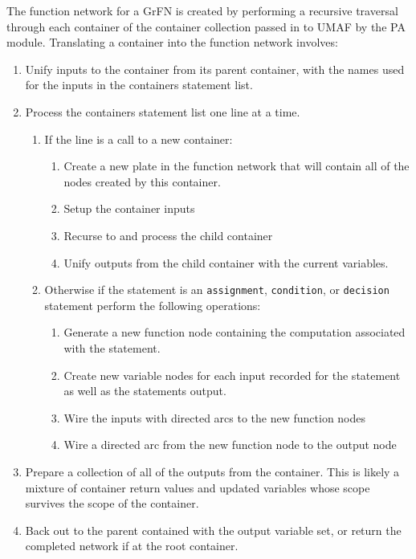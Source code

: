 The function network for a GrFN is created by performing a recursive traversal through each container of the container collection passed in to UMAF by the PA module.
Translating a container into the function network involves:
\begin{enumerate}
  \item Unify inputs to the container from its parent container, with the names used for the inputs in the containers statement list.
  \item Process the containers statement list one line at a time.
  \begin{enumerate}
    \item If the line is a call to a new container:
    \begin{enumerate}
      \item Create a new plate in the function network that will contain all of the nodes created by this container.
      \item Setup the container inputs
      \item Recurse to and process the child container
      \item Unify outputs from the child container with the current variables.
    \end{enumerate}
    \item Otherwise if the statement is an \texttt{assignment}, \texttt{condition}, or \texttt{decision} statement perform the following operations:
    \begin{enumerate}
      \item Generate a new function node containing the computation associated with the statement.
      \item Create new variable nodes for each input recorded for the statement as well as the statements output.
      \item Wire the inputs with directed arcs to the new function nodes
      \item Wire a directed arc from the new function node to the output node
    \end{enumerate}
  \end{enumerate}
  \item Prepare a collection of all of the outputs from the container. This is likely a mixture of container return values and updated variables whose scope survives the scope of the container.
  \item Back out to the parent contained with the output variable set, or return the completed network if at the root container.
\end{enumerate}

